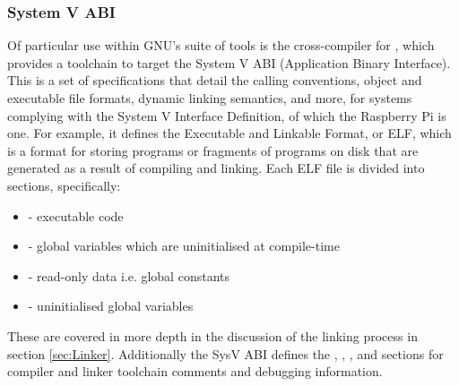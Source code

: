     \subsubsection{System V ABI}
        Of particular use within GNU's suite of tools is the cross-compiler for
        , which provides a toolchain to target the System V
        ABI (Application Binary Interface). This is a set of specifications that
        detail the calling conventions, object and executable file formats,
        dynamic linking semantics, and more, for systems complying with the
        System V Interface Definition, of which the Raspberry Pi is one. For
        example, it defines the Executable and Linkable Format, or ELF, which is
        a format for storing programs or fragments of programs on disk that are
        generated as a result of compiling and linking. Each ELF file is divided
        into sections, specifically:
        \begin{itemize}
            \label{list:LinkerSections}
            \itemsep0em
            \item {} - executable code
            \item {} - global variables which are uninitialised at
                compile-time
            \item {} - read-only data i.e. global constants
            \item {} - uninitialised global variables
        \end{itemize}

        These are covered in more depth in the discussion of the linking process
        in section \ref{sec:Linker}. Additionally the SysV ABI defines the
        , , , and 
        sections for compiler and linker toolchain comments and debugging
        information.

